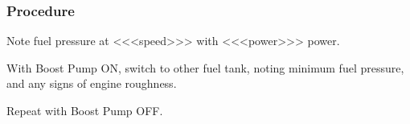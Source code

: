 % 
% 
%
 \subsubsection*{Procedure}
 \begin{compactenum}
   \item Note fuel pressure at <<<speed>>> with <<<power>>> power.
   \item With Boost Pump ON, switch to other fuel tank, noting minimum fuel pressure, and any signs of engine roughness.
   \item Repeat with Boost Pump OFF.
   \end{compactenum}